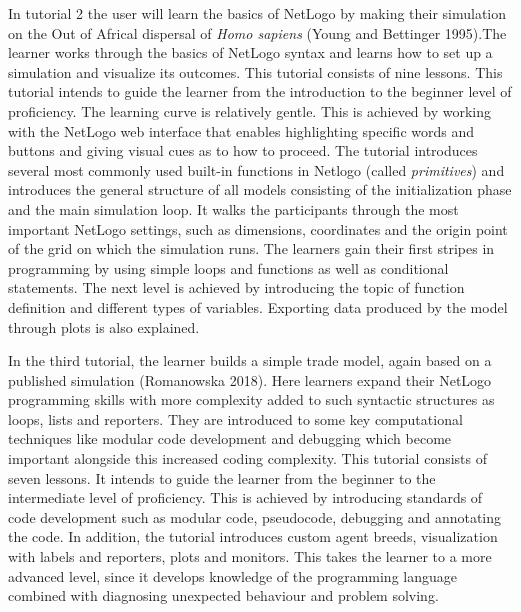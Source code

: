 \documentclass[
]{article}
\begin{document}
In tutorial 2 the user will learn the basics of NetLogo by making their simulation on the Out of Africal dispersal of \emph{Homo sapiens} (Young and Bettinger 1995).The learner works through the basics of NetLogo syntax and learns how to set up a simulation and visualize its outcomes. This tutorial consists of nine lessons. This tutorial intends to guide the learner from the introduction to the beginner level of proficiency. The learning curve is relatively gentle. This is achieved by working with the NetLogo web interface that enables highlighting specific words and buttons and giving visual cues as to how to proceed. The tutorial introduces several most commonly used built-in functions in Netlogo (called \emph{primitives}) and introduces the general structure of all models consisting of the initialization phase and the main simulation loop. It walks the participants through the most important NetLogo settings, such as dimensions, coordinates and the origin point of the grid on which the simulation runs. The learners gain their first stripes in programming by using simple loops and functions as well as conditional statements. The next level is achieved by introducing the topic of function definition and different types of variables. Exporting data produced by the model through plots is also explained.

In the third tutorial, the learner builds a simple trade model, again based on a published simulation (Romanowska 2018). Here learners expand their NetLogo programming skills with more complexity added to such syntactic structures as loops, lists and reporters. They are introduced to some key computational techniques like modular code development and debugging which become important alongside this increased coding complexity. This tutorial consists of seven lessons. It intends to guide the learner from the beginner to the intermediate level of proficiency. This is achieved by introducing standards of code development such as modular code, pseudocode, debugging and annotating the code. In addition, the tutorial introduces custom agent breeds, visualization with labels and reporters, plots and monitors. This takes the learner to a more advanced level, since it develops knowledge of the programming language combined with diagnosing unexpected behaviour and problem solving.
\end{document}
